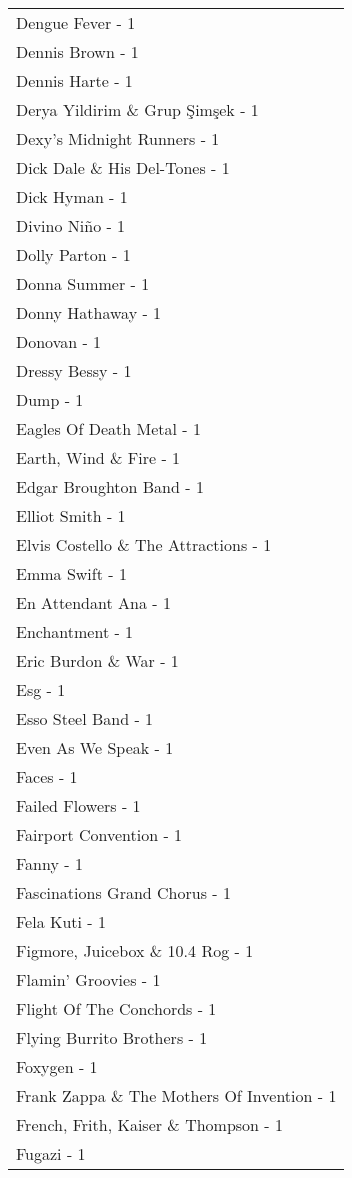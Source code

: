 \documentclass[
]{article}
\begin{document}
\begin{longtable}{l}
Dengue Fever - 1 \\ 
Dennis Brown - 1 \\ 
Dennis Harte - 1 \\ 
Derya Yildirim \& Grup Şimşek - 1 \\ 
Dexy's Midnight Runners - 1 \\ 
Dick Dale \& His Del-Tones - 1 \\ 
Dick Hyman - 1 \\ 
Divino Niño - 1 \\ 
Dolly Parton - 1 \\ 
Donna Summer - 1 \\ 
Donny Hathaway - 1 \\ 
Donovan - 1 \\ 
Dressy Bessy - 1 \\ 
Dump - 1 \\ 
Eagles Of Death Metal - 1 \\ 
Earth, Wind \& Fire - 1 \\ 
Edgar Broughton Band - 1 \\ 
Elliot Smith - 1 \\ 
Elvis Costello \& The Attractions - 1 \\ 
Emma Swift - 1 \\ 
En Attendant Ana - 1 \\ 
Enchantment - 1 \\ 
Eric Burdon \& War - 1 \\ 
Esg - 1 \\ 
Esso Steel Band - 1 \\ 
Even As We Speak - 1 \\ 
Faces - 1 \\ 
Failed Flowers - 1 \\ 
Fairport Convention - 1 \\ 
Fanny - 1 \\ 
Fascinations Grand Chorus - 1 \\ 
Fela Kuti - 1 \\ 
Figmore, Juicebox \& 10.4 Rog - 1 \\ 
Flamin' Groovies - 1 \\ 
Flight Of The Conchords - 1 \\ 
Flying Burrito Brothers - 1 \\ 
Foxygen - 1 \\ 
Frank Zappa \& The Mothers Of Invention - 1 \\ 
French, Frith, Kaiser \& Thompson - 1 \\ 
Fugazi - 1 \\ 

\end{longtable}
\end{document}

